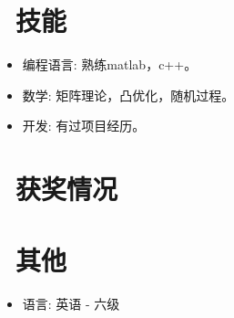 \documentclass{resume}
\begin{document}
\section{\faCogs\ 技能}
\begin{itemize}[parsep=0.5ex]
  \item 编程语言: 熟练matlab，c++。
  \item 数学: 矩阵理论，凸优化，随机过程。
  \item 开发: 有过项目经历。
\end{itemize}

\section{\faHeartO\ 获奖情况}

\section{\faInfo\ 其他}
\begin{itemize}[parsep=0.5ex]
  \item 语言: 英语 - 六级
\end{itemize}
%
%
\end{document}
